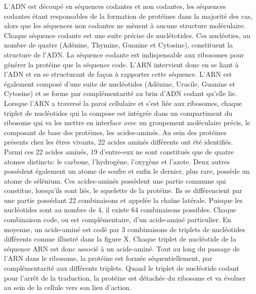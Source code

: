 L'ADN est découpé en séquences codantes et non codantes, les séquences codantes étant responsables de la formation de protéines dans la majorité des cas, alors que les séquences non codantes ne mènent à aucune structure moléculaire. Chaque séquence codante est une suite précise de nuclétotides. Ces nucléoties, au nombre de quatre (Adénine, Thymine, Guanine et Cytosine), constituent la structure de l'ADN. La séquence codante est indispensable aux ribosomes pour générer la protéine que la séquence code. L'ARN intervient donc en se liant à l'ADN et en se structurant de façon à rapporter cette séquence. L'ARN est également composé d'une suite de nucléotides (Adénine, Uracile, Guanine et Cytosine) et se forme par complémentarité au brin d'ADN codant qu'elle lie. Lorsque l'ARN a traversé la paroi cellulaire et s'est liée aux ribosomes, chaque triplet de nucléotides qui la compose est intégrée dans un compartiment du ribosome qui va les mettre en interface avec un groupement moléculaire précis, le composant de base des protéines, les acides-aminés. 
Au sein des protéines présents chez les êtres vivants, 22 acides aminés différents ont été identifiés. Parmi ces 22 acides aminés, 19 d'entre-eux ne sont constitués que de quatre atomes distincts: le carbone, l'hydrogène, l'oxygène et l'azote. Deux autres possèdent également un atome de soufre et enfin le dernier, plus rare, possède un atome de sélénium. Ces acides-aminés possèdent une partie commune qui constitue, lorsqu'ils sont liés, le squelette de la protéine. Ils se différencient par une partie possédant 22 combinaisons et appelée la chaîne latérale. Puisque les nucléotides sont au nombre de 4, il existe 64 combinaisons possibles. Chaque combinaison code, ou est complémentaire, d'un acide-aminé particulier. En moyenne, un acide-aminé est codé par 3 combinaisons de triplets de nucléotides différents comme illustré dans la figure X. Chaque triplet de nucléotide de la séquence ARN est donc associé à un acide-aminé. Tout au long du passage de l'ARN dans le ribosome, la protéine est formée séquentiellement, par complémentarité aux différents triplets. Quand le triplet de nucléotide codant pour l'arrêt de la traduction, la protéine est détachée du ribosome et va évoluer au sein de la cellule vers son lieu d'action.


